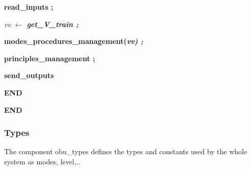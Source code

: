 {\begin{minipage}{14cm}
\hspace*{0.35in}\bf read\_inputs \rm ;

\hspace*{0.35in}\it vv  $\leftarrow$  \bf get\_V\_train \rm ;

\hspace*{0.35in}\bf modes\_procedures\_management\rm (\it vv\rm ) \rm ; \hspace*{0.75in}

\hspace*{0.35in}\bf principles\_management \rm ; \hspace*{0.20in}

\hspace*{0.35in}\bf send\_outputs

\hspace*{0.15in}\bf END

\vspace*{8mm}
\bf END

\end{minipage}
}


\vspace*{8mm}

\subsubsection{Types}

The component obu\_types  defines the types and constants used by the whole system as modes, level,..

